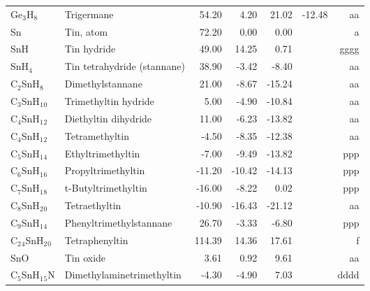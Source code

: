 \begin{table}
\begin{center}
\begin{tabular}{llrrrrr}
 Ge$_3$H$_8$       & Trigermane                             &    54.20    &     4.20  &    21.02  &   -12.48  &     aa\\
 Sn          & Tin, atom                              &    72.20    &     0.00  &     0.00  &  &      a\\
 SnH         & Tin hydride                            &    49.00    &    14.25  &     0.71  &  &   gggg\\
 SnH$_4$        & Tin tetrahydride (stannane)            &    38.90    &    -3.42  &    -8.40  &  &     aa\\
 C$_2$SnH$_8$      & Dimethylstannane                       &    21.00    &    -8.67  &   -15.24  &  &     aa\\
 C$_3$SnH$_1$$_0$     & Trimethyltin hydride                   &     5.00    &    -4.90  &   -10.84  &  &     aa\\
 C$_4$SnH$_1$$_2$     & Diethyltin dihydride                   &    11.00    &    -6.23  &   -13.82  &  &     aa\\
 C$_4$SnH$_1$$_2$     & Tetramethyltin                         &    -4.50    &    -8.35  &   -12.38  &  &     aa\\
 C$_5$SnH$_1$$_4$     & Ethyltrimethyltin                      &    -7.00    &    -9.49  &   -13.82  &  &    ppp\\
 C$_6$SnH$_1$$_6$     & Propyltrimethyltin                     &   -11.20    &   -10.42  &   -14.13  &  &    ppp\\
 C$_7$SnH$_1$$_8$     & t-Butyltrimethyltin                    &   -16.00    &    -8.22  &     0.02  &  &    ppp\\
 C$_8$SnH$_2$$_0$     & Tetraethyltin                          &   -10.90    &   -16.43  &   -21.12  &  &     aa\\
 C$_9$SnH$_1$$_4$     & Phenyltrimethylstannane                &    26.70    &    -3.33  &    -6.80  &  &    ppp\\
 C$_2$$_4$SnH$_2$$_0$    & Tetraphenyltin                         &   114.39    &    14.36  &    17.61  &  &      f\\
 SnO         & Tin oxide                              &     3.61    &     0.92  &     9.61  &  &     aa\\
 C$_5$SnH$_1$$_5$N    & Dimethylaminetrimethyltin              &    -4.30    &    -4.90  &     7.03  &  &   dddd\\
\hline
\end{tabular}
\end{center}
\end{table}
\clearpage

